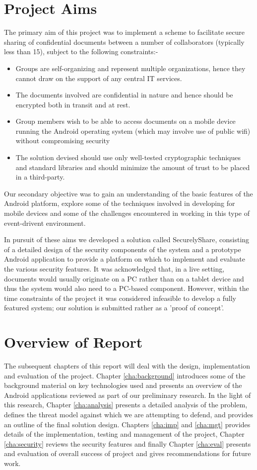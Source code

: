 \section{Project Aims}
\label{sec:aims}
The primary aim of this project was to implement a scheme to facilitate secure sharing of confidential documents between a number of collaborators (typically less than 15), subject to the following constraints:-
\begin{itemize}
\item Groups are self-organizing and represent multiple organizations, hence they cannot draw on the support of any central IT services.
\item The documents involved are confidential in nature and hence should be encrypted both in transit and at rest.
\item Group members wish to be able to access documents on a mobile device running the Android operating system (which may involve use of public wifi) without compromising security 
\item The solution devised should use only well-tested cryptographic techniques and standard libraries and should minimize the amount of trust to be placed in a third-party.
\end{itemize}

Our secondary objective was to gain an understanding of the basic features of the Android platform, explore some of the techniques involved in developing  for mobile devices and some of the challenges encountered in working in this type of event-drivent environment.

In pursuit of these aims we developed a solution called SecurelyShare, consisting of a detailed design of the security components of the system and a prototype Android application to provide a platform on which to implement and evaluate the various security features.  It was acknowledged that, in a live setting, documents would usually originate on a PC rather than on a tablet device and thus the system would also need to a PC-based component.  However, within the time constraints of the project it was considered infeasible to develop a fully featured system; our solution is submitted rather as a 'proof of concept'.

\section{Overview of Report}
\label{sec:overview}

The subsequent chapters of this report will deal with the design, implementation and evaluation of the project.  Chapter \ref{cha:background} introduces some of the background material on key technologies used and presents an overview of the Android applications reviewed as part of our preliminary research.  In the light of this research, Chapter \ref{cha:analysis} presents a detailed analysis of the problem, defines the threat model against which we are attempting to defend, and provides an outline of the final solution design. Chapters \ref{cha:imp} and \ref{cha:mgt} provides details of the implementation, testing and management of the project, Chapter \ref{cha:security} reviews the security features and finally Chapter \ref{cha:eval} presents and evaluation of overall success of project and gives recommendations for future work.